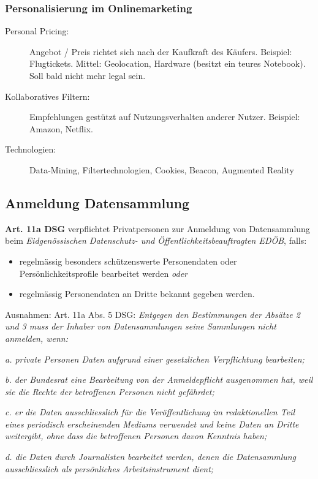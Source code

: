 \subsubsection*{Personalisierung im Onlinemarketing}
\begin{description}
  \item[Personal Pricing:] Angebot / Preis richtet sich nach der Kaufkraft des Käufers. Beispiel: Flugtickets. Mittel: Geolocation, Hardware (besitzt ein teures Notebook). Soll bald nicht mehr legal sein.
  \item[Kollaboratives Filtern:] Empfehlungen gestützt auf Nutzungsverhalten anderer Nutzer. Beispiel: Amazon, Netflix.
  \item[Technologien:] Data-Mining, Filtertechnologien, Cookies, Beacon, Augmented Reality   
\end{description}

\subsection{Anmeldung Datensammlung}
\textbf{Art. 11a DSG} verpflichtet Privatpersonen zur Anmeldung von Datensammlung beim \textit{Eidgenössischen Datenschutz- und Öffentlichkeitsbeauftragten EDÖB}, falls:
\begin{itemize}
  \item regelmässig besonders schützenswerte Personendaten oder Persönlichkeitsprofile bearbeitet werden \textit{oder}
  \item regelmässig Personendaten an Dritte bekannt gegeben werden.
\end{itemize}

\noindent
Ausnahmen: Art. 11a Abs. 5 DSG: 
  \textit{Entgegen den Bestimmungen der Absätze 2 und 3 muss der Inhaber von Datensammlungen seine Sammlungen nicht anmelden, wenn:}

\textit{a. private Personen Daten aufgrund einer gesetzlichen Verpflichtung bearbeiten;}

\textit{b. der Bundesrat eine Bearbeitung von der Anmeldepflicht ausgenommen hat, weil sie die Rechte der betroffenen Personen nicht gefährdet;}

\textit{c. er die Daten ausschliesslich für die Veröffentlichung im redaktionellen Teil eines periodisch erscheinenden Mediums verwendet und keine Daten an Dritte weitergibt, ohne dass die betroffenen Personen davon Kenntnis haben;}

\textit{d. die Daten durch Journalisten bearbeitet werden, denen die Datensammlung ausschliesslich als persönliches Arbeitsinstrument dient;}

